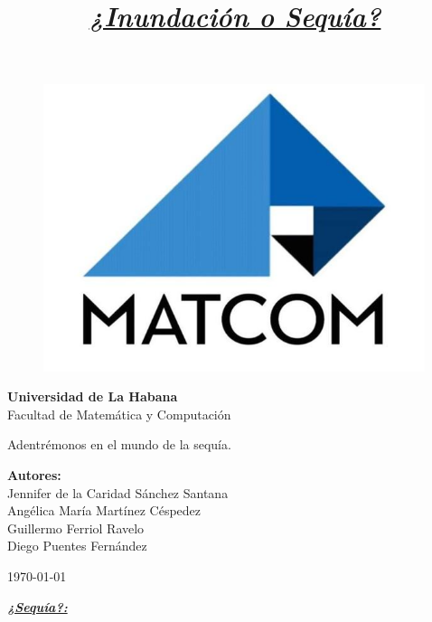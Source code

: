 \documentclass[12pt]{article}
\title{\textbf{\textit{\underline{¿Inundación o Sequía?}}}}
\begin{document}
	
\begin{titlepage}
	\centering
	\vspace*{1cm}
	\begin{figure}
		\centering
		\includegraphics[width=0.3\linewidth]{images/logo}
		\label{fig:logo}
	\end{figure}
	
	\large{\textbf{Universidad de La Habana}\\
	Facultad de Matemática y Computación\\}
	\vspace{3.5cm}
	
	{\rmfamily\selectfont\Huge{Adentrémonos en el mundo de la sequía.}} 
	\vspace{1.5cm}
	
	\Large
	\vspace{2 cm}
	\normalsize{\textbf{Autores:}\\
		Jennifer de la Caridad Sánchez Santana\\
		Angélica María Martínez Céspedez\\
		Guillermo Ferriol Ravelo\\
		Diego Puentes Fernández\\}
	\vfill
	
	\large
	\today
\end{titlepage}

	
	\begin{center}
		\textbf{\textit{\underline{{\fontsize{60}{24}\selectfont ¿Sequía?:}}}}
	\end{center}
	
\end{document}
